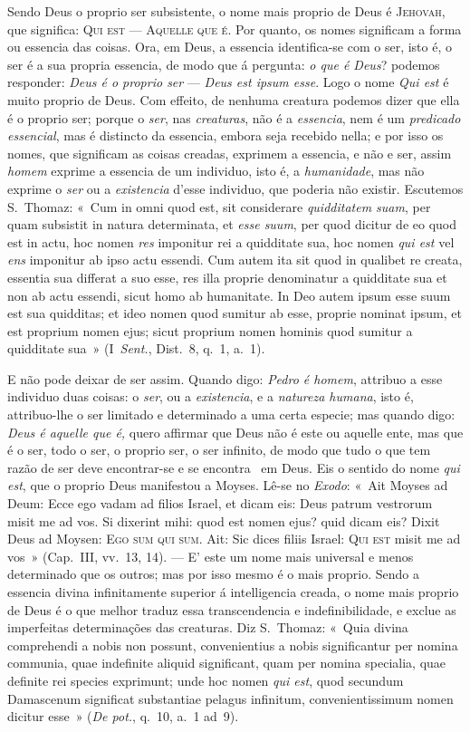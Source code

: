 {Sendo Deus o proprio ser subsistente, o nome mais proprio de Deus é \textsc{Jehovah}, que
significa: \textsc{Qui est} --- \textsc{Aquelle que é}. Por quanto, os nomes significam a
forma ou essencia das coisas. Ora, em Deus, a essencia identifica-se com o ser, isto é, o
ser é a sua propria essencia, de modo que á pergunta: \emph{o que é Deus}? podemos
responder: \emph{Deus é o proprio ser} --- \emph{Deus est ipsum esse}. Logo o nome
\emph{Qui est} é muito proprio de Deus. Com effeito, de nenhuma creatura podemos dizer que
ella é o proprio ser; porque o \emph{ser}, nas \emph{creaturas}, não é a \emph{essencia},
nem é um \emph{predicado essencial}, mas é distincto da essencia, embora seja recebido
nella; e por isso os nomes, que significam as coisas creadas, exprimem a essencia, e não e
ser, assim \emph{homem} exprime a essencia de um individuo, isto é, a \emph{humanidade},
mas não exprime o \emph{ser} ou a \emph{existencia} d'esse individuo, que poderia não
existir. Escutemos S.~Thomaz: «~Cum in omni quod est, sit considerare \emph{quidditatem
suam}, per quam subsistit in natura determinata, et \emph{esse suum}, per quod dicitur de
eo quod est in actu, hoc nomen \emph{res} imponitur rei a quidditate sua, hoc nomen
\emph{qui est} vel \emph{ens} imponitur ab ipso actu essendi. Cum autem ita sit quod in
qualibet re creata, essentia sua differat a suo esse, res illa proprie denominatur a
quidditate sua et non ab actu essendi, sicut homo ab humanitate. In Deo autem ipsum esse
suum est sua quidditas; et ideo nomen quod sumitur ab esse, proprie nominat ipsum, et est
proprium nomen ejus; sicut proprium nomen hominis quod sumitur a quidditate sua~»
(I~\emph{Sent.}, Dist.~8, q.~1, a.~1).

E não pode deixar de ser assim. Quando digo: \emph{Pedro é homem}, attribuo a esse
individuo duas coisas: o \emph{ser}, ou a \emph{existencia}, e a \emph{natureza humana},
isto é, attribuo-lhe o ser limitado e determinado a uma certa especie; mas quando digo:
\emph{Deus é aquelle que é,} quero affirmar que Deus não é este ou aquelle ente, mas que é
o ser, todo o ser, o proprio ser, o ser infinito, de modo que tudo o que tem razão de ser
deve encontrar-se e se encontra ~em Deus. Eis o sentido do nome \emph{qui est},
que o proprio Deus manifestou a Moyses. Lê-se no \emph{Exodo}: «~Ait Moyses ad Deum: Ecce
ego vadam ad filios Israel, et dicam eis: Deus patrum vestrorum misit me ad vos. Si
dixerint mihi: quod est nomen ejus? quid dicam eis? Dixit Deus ad Moysen: \textsc{Ego sum
qui sum}. Ait: Sic dices filiis Israel: \textsc{Qui est} misit me ad vos~» (Cap.~III,
vv.~13, 14). --- E' este um nome mais universal e menos determinado que os outros; mas por
isso mesmo é o mais proprio. Sendo a essencia divina infinitamente superior á
intelligencia creada, o nome mais proprio de Deus é o que melhor traduz essa
transcendencia e indefinibilidade, e exclue as imperfeitas determinações das creaturas.
Diz S.~Thomaz: «~Quia divina comprehendi a nobis non possunt, convenientius a nobis
significantur per nomina communia, quae indefinite aliquid significant, quam per nomina
specialia, quae definite rei species exprimunt; unde hoc nomen \emph{qui est}, quod
secundum Damascenum significat substantiae pelagus infinitum, convenientissimum nomen
dicitur esse~» (\emph{De pot.}, q.~10, a.~1 ad~9).

}
